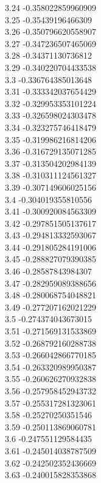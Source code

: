 {3.24	-0.358022859960909\\
3.25	-0.35439196466309\\
3.26	-0.350796620558907\\
3.27	-0.347236507465069\\
3.28	-0.34371130736812\\
3.29	-0.340220704433538\\
3.3	-0.336764385013648\\
3.31	-0.333342037654429\\
3.32	-0.329953353101224\\
3.33	-0.326598024303478\\
3.34	-0.323275746418479\\
3.35	-0.319986216814206\\
3.36	-0.316729135071285\\
3.37	-0.313504202984139\\
3.38	-0.310311124561327\\
3.39	-0.307149606025156\\
3.4	-0.304019355810556\\
3.41	-0.300920084563309\\
3.42	-0.297851505137617\\
3.43	-0.294813332593067\\
3.44	-0.291805284191006\\
3.45	-0.288827079390385\\
3.46	-0.28587843984307\\
3.47	-0.282959089388656\\
3.48	-0.280068754048821\\
3.49	-0.277207162021229\\
3.5	-0.274374043673015\\
3.51	-0.271569131533869\\
3.52	-0.268792160288738\\
3.53	-0.266042866770185\\
3.54	-0.263320989950387\\
3.55	-0.260626270932838\\
3.56	-0.257958452943732\\
3.57	-0.255317281323061\\
3.58	-0.25270250351546\\
3.59	-0.250113869060781\\
3.6	-0.247551129584435\\
3.61	-0.245014038787509\\
3.62	-0.242502352436669\\
3.63	-0.240015828353868\\
}

